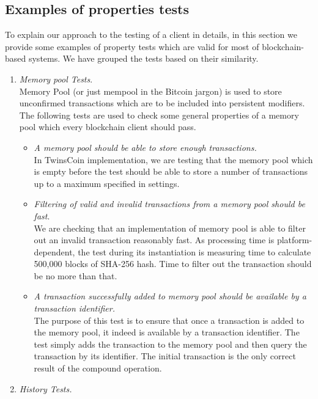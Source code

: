 
\subsection{Examples of properties tests}
\label{sec:examples}

To explain our approach to the testing of a client in details, in this section we provide some examples of property tests which are valid for most of blockchain-based systems. We have grouped the tests based on their similarity.\\

\begin{enumerate}[\IEEEsetlabelwidth{Z}]

\item \textit{Memory pool Tests}.\\
Memory Pool (or just mempool in the Bitcoin jargon) is used to store unconfirmed transactions which are to be included into persistent modifiers. The following tests are used to check some general properties of a memory pool which every blockchain client should pass.

\begin{itemize}[]

\item \textit{A memory pool should be able to store enough transactions.}\\
In TwinsCoin implementation, we are testing that the memory pool which is empty before the test should be able to store a number of transactions up to a maximum specified in settings.\\

\item \textit{Filtering of valid and invalid transactions from a memory pool should be fast}.\\
We are checking that an implementation of memory pool is able to filter out an invalid transaction reasonably fast. As processing time is platform-dependent, the test during its instantiation is measuring time to calculate 500,000 blocks of SHA-256 hash. Time to filter out the transaction should be no more than that. \\

\item \textit{A transaction successfully added to memory pool should be available by a transaction identifier.}\\
The purpose of this test is to ensure that once a transaction is added to the memory pool, it indeed is available by a transaction identifier. The test simply adds the transaction to the memory pool and then query the transaction by its identifier. The initial transaction is the only correct result of the compound operation. \\
\end{itemize}
\item \textit{History Tests.}\\


\end{enumerate}
